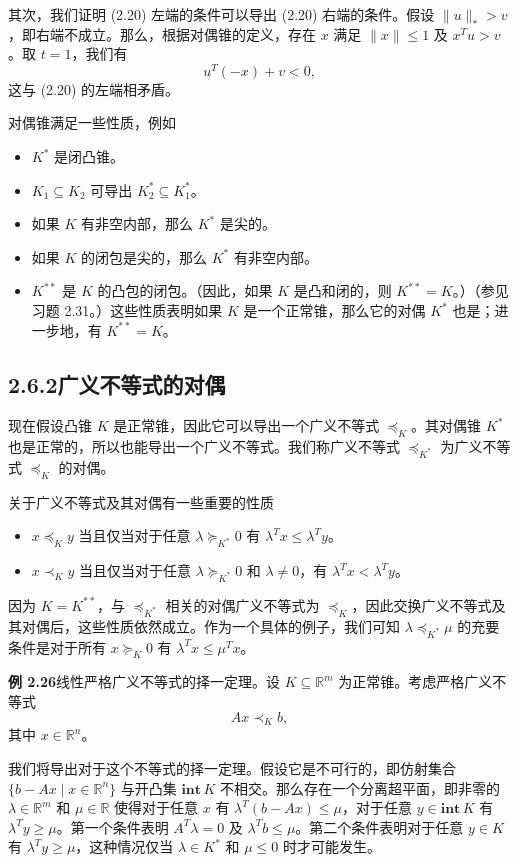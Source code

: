 \documentclass[UTF8,12pt,a4paper,fontset=fandol]{ctexart}
\begin{document}
其次，我们证明 (2.20) 左端的条件可以导出 (2.20) 右端的条件。假设 $\|u\|_*>v$，即右端不成立。那么，根据对偶锥的定义，存在 $x$ 满足 $\|x\|\le1$ 及 $x^Tu>v$。取 $t=1$，我们有
\[
  u^T(-x)+v<0,
\]
这与 (2.20) 的左端相矛盾。

对偶锥满足一些性质，例如
\begin{itemize}
  \item $K^*$ 是闭凸锥。
  \item $K_1\subseteq K_2$ 可导出 $K_2^*\subseteq K_1^*$。
  \item 如果 $K$ 有非空内部，那么 $K^*$ 是尖的。
  \item 如果 $K$ 的闭包是尖的，那么 $K^*$ 有非空内部。
  \item $K^{**}$ 是 $K$ 的凸包的闭包。（因此，如果 $K$ 是凸和闭的，则 $K^{**}=K$。）（参见习题 2.31。）这些性质表明如果 $K$ 是一个正常锥，那么它的对偶 $K^*$ 也是；进一步地，有 $K^{**}=K$。
\end{itemize}

\subsection*{2.6.2\quad 广义不等式的对偶}

现在假设凸锥 $K$ 是正常锥，因此它可以导出一个广义不等式 $\preceq_K$。其对偶锥 $K^*$ 也是正常的，所以也能导出一个广义不等式。我们称广义不等式 $\preceq_{K^*}$ 为广义不等式 $\preceq_K$ 的对偶。

关于广义不等式及其对偶有一些重要的性质
\begin{itemize}
  \item $x\preceq_K y$ 当且仅当对于任意 $\lambda\succeq_{K^*}0$ 有 $\lambda^Tx\le\lambda^Ty$。
  \item $x\prec_K y$ 当且仅当对于任意 $\lambda\succeq_{K^*}0$ 和 $\lambda\ne0$，有 $\lambda^Tx<\lambda^Ty$。
\end{itemize}
因为 $K=K^{**}$，与 $\preceq_{K^*}$ 相关的对偶广义不等式为 $\preceq_K$，因此交换广义不等式及其对偶后，这些性质依然成立。作为一个具体的例子，我们可知 $\lambda\preceq_{K^*}\mu$ 的充要条件是对于所有 $x\succeq_K0$ 有 $\lambda^Tx\le\mu^Tx$。

\noindent\textbf{例 2.26}\quad 线性严格广义不等式的择一定理。设 $K\subseteq\mathbb{R}^m$ 为正常锥。考虑严格广义不等式
\begin{equation}
  Ax\prec_K b,
  \tag{2.21}
\end{equation}
其中 $x\in\mathbb{R}^n$。

我们将导出对于这个不等式的择一定理。假设它是不可行的，即仿射集合 $\{b-Ax\mid x\in\mathbb{R}^n\}$ 与开凸集 $\mathbf{int}\,K$ 不相交。那么存在一个分离超平面，即非零的 $\lambda\in\mathbb{R}^m$ 和 $\mu\in\mathbb{R}$ 使得对于任意 $x$ 有 $\lambda^T(b-Ax)\le\mu$，对于任意 $y\in\mathbf{int}\,K$ 有 $\lambda^Ty\ge\mu$。第一个条件表明 $A^T\lambda=0$ 及 $\lambda^Tb\le\mu$。第二个条件表明对于任意 $y\in K$ 有 $\lambda^Ty\ge\mu$，这种情况仅当 $\lambda\in K^*$ 和 $\mu\le0$ 时才可能发生。
\end{document}
